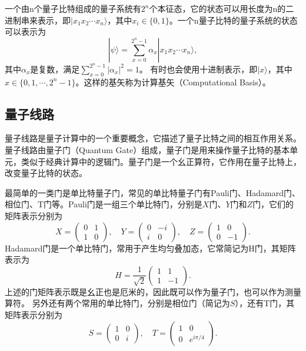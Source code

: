 一个由n个量子比特组成的量子系统有$2^n$个本征态，它的状态可以用长度为n的二进制串来表示，即$|x_1x_2\cdots x_n\rangle$，其中$x_i \in \{0, 1\}$。一个n量子比特的量子系统的状态可以表示为
\begin{equation}
    |\psi\rangle = \sum_{x=0}^{2^n-1} \alpha_x |x_1x_2\cdots x_n\rangle,
\end{equation}
其中$\alpha_x$是复数，满足$\sum_{x=0}^{2^n-1} |\alpha_x|^2 = 1$。
有时也会使用十进制表示，即$|x\rangle$，其中$x \in \{0, 1, \cdots, 2^n-1\}$。这样的基矢称为计算基矢（Computational Basis）。

\subsection{量子线路}
量子线路是量子计算中的一个重要概念，它描述了量子比特之间的相互作用关系。量子线路由量子门（Quantum Gate）组成，量子门是用来操作量子比特的基本单元，类似于经典计算中的逻辑门。量子门是一个幺正算符，它作用在量子比特上，改变量子比特的状态。

最简单的一类门是单比特量子门，常见的单比特量子门有Pauli门、Hadamard门、相位门、T门等。Pauli门是一组三个单比特门，分别是$X$门、$Y$门和$Z$门，它们的矩阵表示分别为
\begin{equation}
    X = \begin{pmatrix} 0 & 1 \\ 1 & 0 \end{pmatrix}, \quad Y = \begin{pmatrix} 0 & -i \\ i & 0 \end{pmatrix}, \quad Z = \begin{pmatrix} 1 & 0 \\ 0 & -1 \end{pmatrix}.
\end{equation}
Hadamard门是一个单比特门，常用于产生均匀叠加态，它常简记为H门，其矩阵表示为
\begin{equation}
    H = \frac{1}{\sqrt{2}}\begin{pmatrix} 1 & 1 \\ 1 & -1 \end{pmatrix}.
\end{equation}
上述的门矩阵表示既是幺正也是厄米的，因此既可以作为量子门，也可以作为测量算符。
另外还有两个常用的单比特门，分别是相位门（简记为$S$），还有T门，其矩阵表示分别为
\begin{equation}
    S = \begin{pmatrix} 1 & 0 \\ 0 & i \end{pmatrix}, \quad T = \begin{pmatrix} 1 & 0 \\ 0 & e^{i\pi/4} \end{pmatrix}.
\end{equation}

